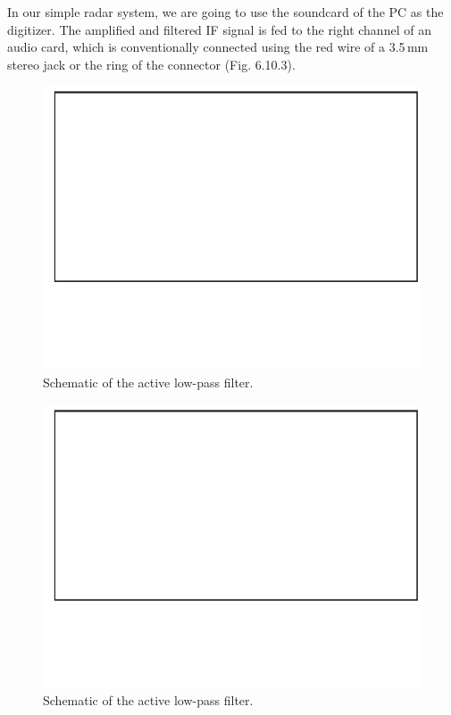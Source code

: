 \documentclass[letterpaper, 11pt]{article}
\begin{document}
In our simple radar system, we are going to use the soundcard of the PC as the digitizer. The amplified and filtered IF signal is fed to the right channel of an audio card, which is conventionally connected using the red wire of a 3.5\,mm stereo jack or the ring of the connector (Fig. 6.10.3). 

\begin{figure}[h]
	\centering
	\includegraphics{lpf_sch}
	\caption{Schematic of the active low-pass filter.}
	\label{fig:lpf_sch}
\end{figure}

\begin{figure}
	\centering
	\includegraphics{lpf_pic}
	\caption{Schematic of the active low-pass filter.}
	\label{fig:lpf_pic}
\end{figure}
\end{document}
